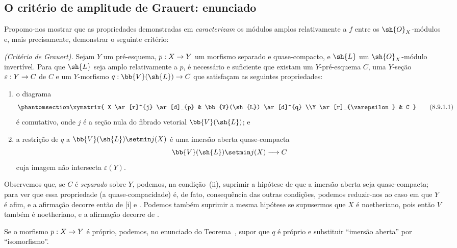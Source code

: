 \documentclass[oneside,10pt]{amsart}
\makeatletter
\newcommand{\ega@arrow}[2]{\mathchoice{#1}{#2}{#2}{#2}}
\renewcommand{\to}{\ega@arrow{\longrightarrow}{\rightarrow}}
\newcommand{\oldpage}[2][]{\marginnote{\normalfont\footnotesize\textbf{#1}~|~#2}\ignorespaces}
\let\EGAOriginalLabel\label
\renewcommand{\label}[1]{\phantomsection\EGAOriginalLabel{#1}}
\makeatother
\begin{document}
\subsection{O critério de amplitude de Grauert: enunciado}
\label{subsection:II.8.9}

Propomo-nos mostrar que as propriedades demonstradas em  \emph{caracterizam} os módulos amplos relativamente a $f$ entre os $\sh{O}_X$-módulos e, mais precisamente, demonstrar o seguinte critério:
\begin{theorem}[8.9.1]
\label{II.8.9.1}
\emph{(Critério de Grauert).}
Sejam $Y$ um pré-esquema, $p:X\to Y$ um morfismo separado e quase-compacto, e $\sh{L}$ um $\sh{O}_X$-módulo invertível.
Para que $\sh{L}$ seja amplo relativamente a $p$, é necessário e suficiente que existam um $Y$-pré-esquema $C$, uma $Y$-seção $\varepsilon:Y\to C$ de $C$ e um $Y$-morfismo $q:\bb{V}(\sh{L})\to C$ que satisfaçam as seguintes propriedades:
\begin{enumerate}
  \item[\rm{(i)}] o diagrama
    \[
      \label{II.8.9.1.1}
        \xymatrix{
          X
            \ar[r]^{j}
            \ar[d]_{p}
        & \bb{V}(\sh{L})
            \ar[d]^{q}
        \\Y
            \ar[r]_{\varepsilon}
        & C
        }
      \tag{8.9.1.1}
    \]
    é comutativo, onde $j$ é a seção nula do fibrado vetorial $\bb{V}(\sh{L})$; e
  \item[\rm{(ii)}] a restrição de $q$ a $\bb{V}(\sh{L})\setmin j(X)$ é uma imersão aberta quase-compacta
    \[
      \bb{V}(\sh{L})\setmin j(X)\to C
    \]
    cuja imagem não intersecta $\varepsilon(Y)$.
\end{enumerate}
\end{theorem}

Observemos que, se $C$ é \emph{separado} sobre $Y$, podemos, na condição~(ii), suprimir a hipótese de que a imersão aberta seja quase-compacta;
para ver que essa propriedade (a quase-compacidade) é, de fato, consequência das outras condições, podemos reduzir-nos ao caso em que $Y$ é afim, e a afirmação decorre então de [i] e .
Podemos também suprimir
\oldpage[II]{183}
a mesma hipótese se supusermos que $X$ é noetheriano, pois então $V$ também é noetheriano, e a afirmação decorre de .

\begin{corollary}[8.9.2]
\label{II.8.9.2}
Se o morfismo $p:X\to Y$ é próprio, podemos, no enunciado do Teorema~, supor que $q$ é próprio e substituir “imersão aberta” por “isomorfismo”.
\end{corollary}
\end{document}
